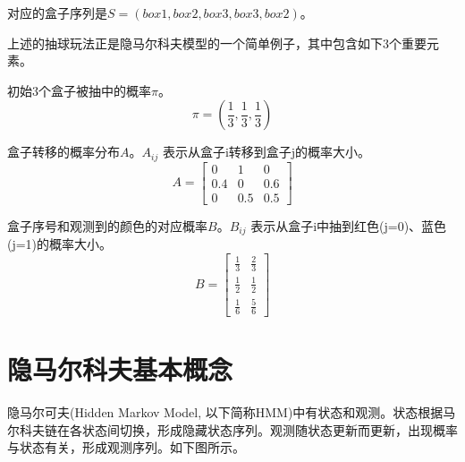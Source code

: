 \documentclass[]{article}
\begin{document}
    对应的盒子序列是$S=(box 1, box 2, box 3, box 3, box 2)$。
    
    上述的抽球玩法正是隐马尔科夫模型的一个简单例子，其中包含如下3个重要元素。
    
    初始3个盒子被抽中的概率$\pi$。
    \begin{equation}
    	\pi=(\frac{1}{3},\frac{1}{3},\frac{1}{3})
    \end{equation}
    
    盒子转移的概率分布$A$。$A_{ij}$ 表示从盒子i转移到盒子j的概率大小。   
    \begin{equation}
    	A = 
    	\begin{bmatrix}
    		0 & 1 & 0 \\
    		0.4 & 0 & 0.6 \\
    		0 & 0.5 & 0.5 
        \end{bmatrix}
    \end{equation}

   盒子序号和观测到的颜色的对应概率$B$。$B_{ij}$ 表示从盒子i中抽到红色(j=0)、蓝色(j=1)的概率大小。   
    \begin{equation}
   		B = 
   		\begin{bmatrix}
   			\frac{1}{3} & \frac{2}{3} \\
   			\frac{1}{2} & \frac{1}{2}  \\
   			\frac{1}{6} & \frac{5}{6} 
   		\end{bmatrix}
   \end{equation}

\section{隐马尔科夫基本概念}
    隐马尔可夫(Hidden Markov Model, 以下简称HMM)中有状态和观测。状态根据马尔科夫链在各状态间切换，形成隐藏状态序列。观测随状态更新而更新，出现概率与状态有关，形成观测序列。如下图所示。
    
\end{document}
